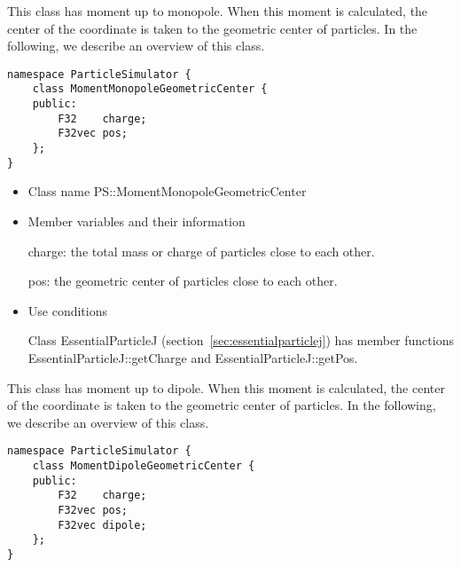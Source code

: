 This class has moment up to monopole. When this moment is calculated,
the center of the coordinate is taken to the geometric center of
particles. In the following, we describe an overview of this class.
\begin{screen}
\begin{verbatim}
namespace ParticleSimulator {
    class MomentMonopoleGeometricCenter {
    public:
        F32    charge;    
        F32vec pos;
    };
}
\end{verbatim}
\end{screen}

\begin{itemize}
\item Class name
  PS::MomentMonopoleGeometricCenter

\item Member variables and their information

  charge: the total mass or charge of particles close to each other.

  pos: the geometric center of particles close to each other.

\item Use conditions

  Class EssentialParticleJ (section~\ref{sec:essentialparticlej}) has
  member functions EssentialParticleJ::getCharge and
  EssentialParticleJ::getPos.

\end{itemize}


This class has moment up to dipole. When this moment is calculated,
the center of the coordinate is taken to the geometric center of
particles. In the following, we describe an overview of this class.
\begin{screen}
\begin{verbatim}
namespace ParticleSimulator {
    class MomentDipoleGeometricCenter {
    public:
        F32    charge;    
        F32vec pos;
        F32vec dipole;
    };
}
\end{verbatim}
\end{screen}

